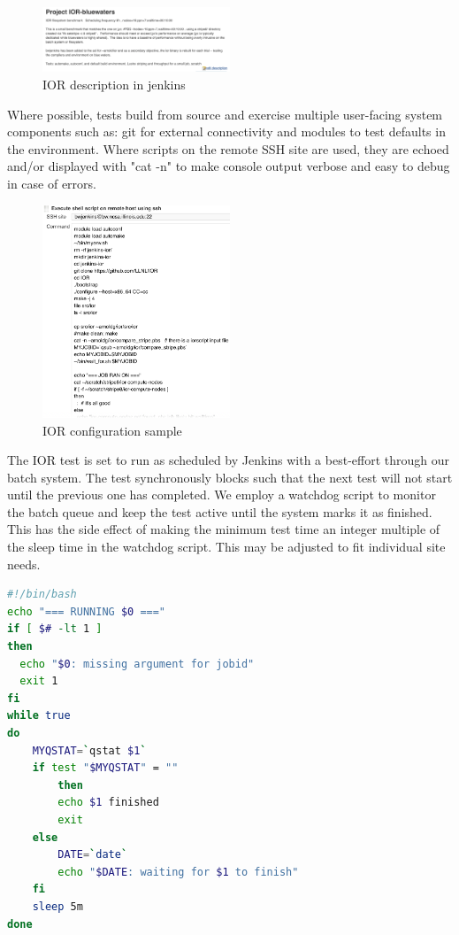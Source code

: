 \documentclass[10pt, conference, compsocconf]{IEEEtran}
\begin{document}
\begin{figure}[H]
\centering
\includegraphics[width=0.5\textwidth]{IOR-bluewaters-descr}
\caption{ IOR description in jenkins }
\label{fig:IOR-bluewaters-descr}
\end{figure}
Where possible, tests build from source and exercise multiple user-facing system components such as: git for external connectivity and modules to test defaults in the environment. 
 Where scripts on the remote SSH site are used, they are echoed and/or displayed with "cat -n" to make console output verbose and easy to debug in case of errors. 
 
\begin{figure}[H]
\centering
\includegraphics[width=0.5\textwidth]{IOR-configuration-sample}
\caption{ IOR configuration sample }
\label{fig:IOR-configuration-sample}
\end{figure}
The IOR test is set to run as scheduled by Jenkins with a best-effort through our batch system.  The test synchronously blocks such that the next test will not start until the previous one has completed.  We employ a watchdog script to monitor the batch queue and keep the test active until the system marks it as finished.  This has the side effect of making the minimum test time an integer multiple of the sleep time in the watchdog script.  This may be adjusted to fit individual site needs.
\begin{lstlisting}[frame=tb,captionpos=t,language=bash,caption={pbs/torque watchdog script}, label=lst:watchdog]
#!/bin/bash
echo "=== RUNNING $0 ==="
if [ $# -lt 1 ]
then
  echo "$0: missing argument for jobid"
  exit 1
fi
while true
do
	MYQSTAT=`qstat $1`
	if test "$MYQSTAT" = ""
        then
		echo $1 finished
		exit
	else
		DATE=`date`
		echo "$DATE: waiting for $1 to finish"
	fi
	sleep 5m
done
\end{lstlisting}
\end{document}

